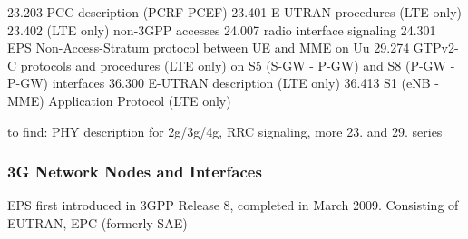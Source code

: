 23.203 \cite{3gpp.23.203} \gls{PCC} description (\gls{PCRF} \gls{PCEF})
23.401 \cite{3gpp.23.401} \gls{E-UTRAN} procedures (LTE only)
23.402 \cite{3gpp.23.402} (LTE only) non-\gls{3GPP} accesses
24.007 \cite{3gpp.24.007} radio interface signaling
24.301 \cite{3gpp.24.301} EPS Non-Access-Stratum protocol between UE and MME on Uu
29.274 \cite{3gpp.29.274} GTPv2-C protocols and procedures (LTE only) on S5 (S-GW - P-GW) and S8 (P-GW - P-GW) interfaces
36.300 \cite{3gpp.36.300} \gls{E-UTRAN} description (LTE only) 
36.413 \cite{3gpp.36.413} S1 (\gls{eNB} - \gls{MME}) Application Protocol (LTE only)

to find: PHY description for 2g/3g/4g, RRC signaling, more 23. and 29. series

\subsubsection{3G Network Nodes and Interfaces}


EPS first introduced in 3GPP Release 8, completed in March 2009. Consisting of EUTRAN, EPC (formerly SAE)



